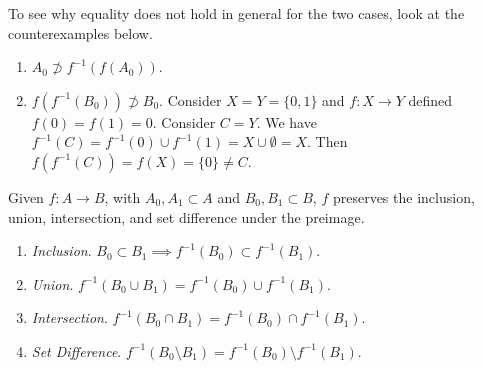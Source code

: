   \begin{example}
    To see why equality does not hold in general for the two cases, look at the counterexamples below. 
    \begin{enumerate}
      \item $A_0 \not\supset f^{-1} (f(A_0))$. 
      \item $f(f^{-1}(B_0)) \not\supset B_0$. Consider $X = Y = \{0, 1\}$ and $f: X \rightarrow Y$ defined $f(0) = f(1) = 0$. Consider $C = Y$. We have $f^{-1} (C) = f^{-1} (0) \cup f^{-1} (1) = X \cup \emptyset = X$. Then $f(f^{-1} (C)) = f(X) = \{0\} \neq C$. 
    \end{enumerate}
  \end{example}

  \begin{theorem}
    Given $f: A \rightarrow B$, with $A_0, A_1 \subset A$ and $B_0, B_1 \subset B$, $f$ preserves the inclusion, union, intersection, and set difference under the preimage. 
    \begin{enumerate}
      \item \textit{Inclusion}. $B_0 \subset B_1 \implies f^{-1} (B_0) \subset f^{-1} (B_1)$. 
      \item \textit{Union}. $f^{-1} (B_0 \cup B_1) = f^{-1} (B_0) \cup f^{-1} (B_1)$. 
      \item \textit{Intersection}. $f^{-1} (B_0 \cap B_1) = f^{-1} (B_0) \cap f^{-1} (B_1)$. 
      \item \textit{Set Difference}. $f^{-1}(B_0 \setminus B_1) = f^{-1} (B_0) \setminus f^{-1} (B_1)$. 
    \end{enumerate}
  \end{theorem} 
